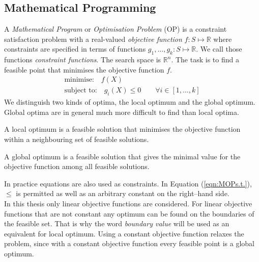 
\subsection{Mathematical Programming}
A \emph{Mathematical Program} or \emph{Optimisation Problem} (OP) is a constraint satisfaction problem with a real-valued \emph{objective function} $f:S\mapsto \mathbb{R}$ where constraints are specified in terms of functions $g_1,\dots,g_k:S\mapsto\mathbb{R}$. We call those functions \emph{constraint functions}. The search space is $\mathbb{R}^n$. The task is to find a feasible point that minimises the objective function $f$.
\begin{eqnarray}
\text{minimise:} \quad f(X)\\
\text{subject to:} \quad g_i(X)\leq 0 \qquad \forall i\in\left[1,\dots ,k\right] \label{eqn:MOPs.t.}
\end{eqnarray}
We distinguish two kinds of optima, the local optimum and the global optimum. Global optima are in general much more difficult to find than local optima.
\begin{definition}
A local optimum is a feasible solution that minimises the objective function within a neighbouring set of feasible solutions.
\end{definition}
\begin{definition}
A global optimum is a feasible solution that gives the minimal value for the objective function among all feasible solutions.
\end{definition}
In practice equations are also used as constraints. In Equation (\ref{eqn:MOPs.t.}), $\leq$ is permitted as well as an arbitrary constant on the right--hand side. \\
In this thesis only linear objective functions are considered. For linear objective functions that are not constant any optimum can be found on the boundaries of the feasible set. That is why the word \emph{boundary value} will be used as an equivalent for local optimum. Using a constant objective function relaxes the problem, since with a constant objective function every feasible point is a global optimum.\\
